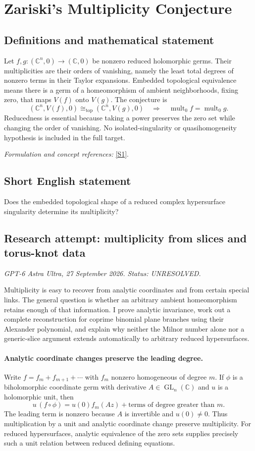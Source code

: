 \documentclass[11pt]{article}
\begin{document}
\section*{\texorpdfstring{Zariski's Multiplicity Conjecture}{Zariski's Multiplicity Conjecture}}\label{statement}
\subsection{Definitions and mathematical statement}
Let $f,g:({\mathbb{C}}^n,0)\to({\mathbb{C}},0)$ be nonzero reduced holomorphic germs. Their multiplicities are their orders of vanishing, namely the least total degrees of nonzero terms in their Taylor expansions. Embedded topological equivalence means there is a germ of a homeomorphism of ambient neighborhoods, fixing zero, that maps $V(f)$ onto $V(g)$. The conjecture is
\[
 ({\mathbb{C}}^n,V(f),0)\cong_{\mathrm{top}}({\mathbb{C}}^n,V(g),0)
 \quad\Longrightarrow\quad\operatorname{mult}_0f=\operatorname{mult}_0g.
\]
Reducedness is essential because taking a power preserves the zero set while changing the order of vanishing. No isolated-singularity or quasihomogeneity hypothesis is included in the full target.
\par\smallskip\textit{Formulation and concept references:} \href{https://arxiv.org/html/2309.02624}{[S1]}.

\subsection{Short English statement}
Does the embedded topological shape of a reduced complex hypersurface singularity determine its multiplicity?
\subsection{Research attempt: multiplicity from slices and torus-knot data}
\textit{GPT-6 Astra Ultra, 27 September 2026. Status: UNRESOLVED.}

Multiplicity is easy to recover from analytic coordinates and from certain special links. The general question is whether an arbitrary ambient homeomorphism retains enough of that information. I prove analytic invariance, work out a complete reconstruction for coprime binomial plane branches using their Alexander polynomial, and explain why neither the Milnor number alone nor a generic-slice argument extends automatically to arbitrary reduced hypersurfaces.

\paragraph{Analytic coordinate changes preserve the leading degree.}
Write $f=f_m+f_{m+1}+\cdots$ with $f_m$ nonzero homogeneous of degree $m$. If $\phi$ is a biholomorphic coordinate germ with derivative $A\in\operatorname{GL}_n(\mathbb C)$ and $u$ is a holomorphic unit, then
\[
 u\,(f\circ\phi)=u(0)f_m(Az)+\text{terms of degree greater than }m.
\]
The leading term is nonzero because $A$ is invertible and $u(0)\ne0$. Thus multiplication by a unit and analytic coordinate change preserve multiplicity. For reduced hypersurfaces, analytic equivalence of the zero sets supplies precisely such a unit relation between reduced defining equations.
\end{document}
